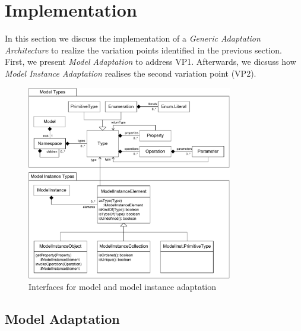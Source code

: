 \section{Implementation}

	In this section we discuss the implementation of a \emph{Generic Adaptation
	Architecture} to realize the
	variation points identified in the previous section. First, we present
	\emph{Model Adaptation} to address VP1. Afterwards, we dicsuss how \emph{Model
	Instance Adaptation} realises the second variation point (VP2).
	
	\begin{figure}[!t]
			\centering
				\includegraphics[width=0.80\textwidth]{figures/coreconcepts.pdf}
			\caption{
			Interfaces for model and model instance adaptation
			}
			\label{fig:coreconcepts}
		\end{figure}

\subsection{Model Adaptation}

